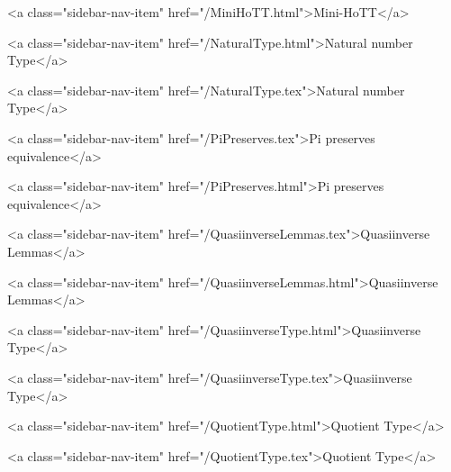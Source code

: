       
        
          <a class="sidebar-nav-item" href="/MiniHoTT.html">Mini-HoTT</a>
        
      
    
      
        
          <a class="sidebar-nav-item" href="/NaturalType.html">Natural number Type</a>
        
      
    
      
        
          <a class="sidebar-nav-item" href="/NaturalType.tex">Natural number Type</a>
        
      
    
      
        
          <a class="sidebar-nav-item" href="/PiPreserves.tex">Pi preserves equivalence</a>
        
      
    
      
        
          <a class="sidebar-nav-item" href="/PiPreserves.html">Pi preserves equivalence</a>
        
      
    
      
        
          <a class="sidebar-nav-item" href="/QuasiinverseLemmas.tex">Quasiinverse Lemmas</a>
        
      
    
      
        
          <a class="sidebar-nav-item" href="/QuasiinverseLemmas.html">Quasiinverse Lemmas</a>
        
      
    
      
        
          <a class="sidebar-nav-item" href="/QuasiinverseType.html">Quasiinverse Type</a>
        
      
    
      
        
          <a class="sidebar-nav-item" href="/QuasiinverseType.tex">Quasiinverse Type</a>
        
      
    
      
        
          <a class="sidebar-nav-item" href="/QuotientType.html">Quotient Type</a>
        
      
    
      
        
          <a class="sidebar-nav-item" href="/QuotientType.tex">Quotient Type</a>
        
